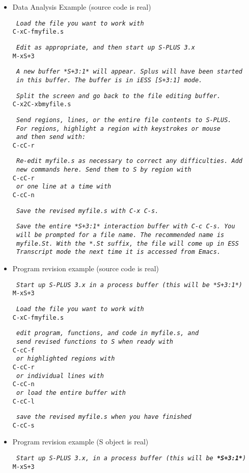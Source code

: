 \documentclass{article}
\newcommand*{\Splus}{\textsc{S-PLUS}}
\newcommand*{\Scmt}[1]{\hbox{\qquad {\footnotesize \#\#} \textsl{#1}}}
\newenvironment{Salltt}{\small\begin{alltt}}{\end{alltt}}
\begin{document}
\begin{itemize}
\item Data Analysis Example (source code is real)
\begin{Salltt}
  \Scmt{Load the file you want to work with}
  C-x C-f myfile.s

  \Scmt{Edit as appropriate, and then start up \Splus~3.x}
  M-x S+3

  \Scmt{A new buffer *S+3:1* will appear.  Splus will have been started}
  \Scmt{in this buffer.  The buffer is in iESS [S+3:1] mode.}

  \Scmt{Split the screen and go back to the file editing buffer.}
  C-x 2 C-x b myfile.s

  \Scmt{Send regions, lines, or the entire file contents to \Splus.}
  \Scmt{For regions, highlight a region with keystrokes or mouse}
  \Scmt{and then send with:}
  C-c C-r

  \Scmt{Re-edit myfile.s as necessary to correct any difficulties.  Add}
  \Scmt{new commands here.  Send them to S by region with}
  C-c C-r
  \Scmt{or one line at a time with}
  C-c C-n

  \Scmt{Save the revised myfile.s with C-x C-s.}

  \Scmt{Save the entire *S+3:1* interaction buffer with C-c C-s.  You}
  \Scmt{will be prompted for a file name.  The recommended name is}
  \Scmt{myfile.St.  With the *.St suffix, the file will come up in ESS}
  \Scmt{Transcript mode the next time it is accessed from Emacs.}
  \end{Salltt}

\item Program revision example (source code is real)
  \begin{Salltt}
  \Scmt{Start up \Splus~3.x in a process buffer (this will be *S+3:1*)}
  M-x S+3

  \Scmt{Load the file you want to work with}
  C-x C-f myfile.s
  
  \Scmt{edit program, functions, and code in myfile.s, and}
  \Scmt{send revised functions to S when ready with}
  C-c C-f
  \Scmt{or highlighted regions with}
  C-c C-r
  \Scmt{or individual lines with}
  C-c C-n
  \Scmt{or load the entire buffer with} 
  C-c C-l

  \Scmt{save the revised myfile.s when you have finished}
  C-c C-s
  \end{Salltt}

\item Program revision example (S object is real)
  \begin{Salltt}
  \Scmt{Start up \Splus~3.x, in a process buffer (this will be \textbf{*S+3:1*})} 
  M-x S+3


\end{Salltt}
\end{itemize}
\end{document}

